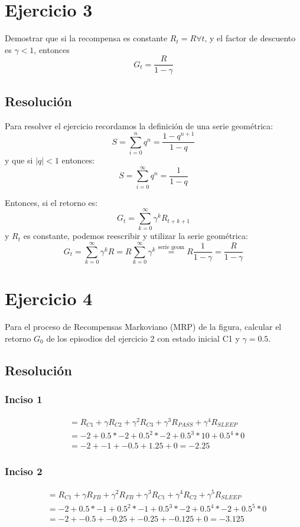 \documentclass[12pt,a4paper]{article}
\begin{document}
\section{Ejercicio 3}

Demostrar que si la recompensa es constante $R_t = R \forall t$, 
y el factor de descuento es $\gamma<1$, entonces $$G_t = \frac{R}{1-\gamma}$$

\subsection{Resolución}

Para resolver el ejercicio recordamos la definición de una serie geométrica:
$$ S= \sum_{i=0}^n q^n = \frac{1-q^{n+1}}{1-q} $$
y que si $|q|<1$ entonces:
$$ S= \sum_{i=0}^\infty q^n = \frac{1}{1-q} $$

Entonces, si el retorno es:
$$ G_t = \sum_{k=0}^\infty \gamma^k R_{t+k+1} $$
y $R_t$ es constante, podemos reescribir y utilizar la serie geométrica:
$$ G_t = \sum_{k=0}^\infty \gamma^k R = R \sum_{k=0}^\infty \gamma^k \stackrel{\text{serie geom}}{=} R \frac{1}{1-\gamma} = \frac{R}{1-\gamma} $$

\section{Ejercicio 4}

Para el proceso de Recompensas Markoviano (MRP) de la figura,
calcular el retorno $G_0$ de los episodios del ejercicio 2
con estado inicial C1 y $\gamma=0.5$.

\subsection{Resolución}

\subsubsection{Inciso 1}

\begin{align}
\tag{1} &= R_{C1} + \gamma R_{C2} + \gamma^2 R_{C3} + \gamma^3 R_{PASS}  + \gamma^4 R_{SLEEP} \\
\tag{2} &= -2     + 0.5 * -2      + 0.5^2 * -2      + 0.5^3 * 10         + 0.5^4 * 0 \\
\tag{3} &= -2 + -1 + -0.5 + 1.25 + 0 = -2.25
\end{align}

\subsubsection{Inciso 2}
\begin{align}
\tag{1} &= R_{C1} + \gamma R_{FB} + \gamma^2 R_{FB} + \gamma^3 R_{C1} + \gamma^4 R_{C2} + \gamma^5 R_{SLEEP} \\
\tag{2} &= -2     + 0.5 * -1      + 0.5^2 * -1      + 0.5^3 * -2      + 0.5^4 * -2      + 0.5^5 * 0 \\
\tag{3} &= -2 + -0.5 + -0.25 + -0.25 + -0.125 + 0 = -3.125
\end{align}
\end{document}
